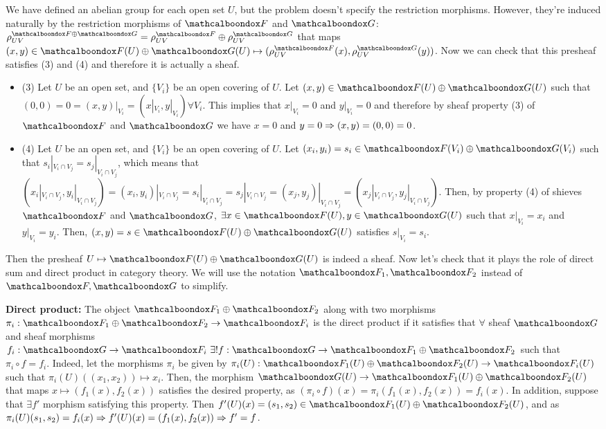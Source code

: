 \begin{sol}
	We have defined an abelian group for each open set $U$, but the problem doesn't specify the restriction morphisms. However, they're induced naturally by the restriction morphisms of $\sF$ and $\sG$: $\rho_{UV}^{\sF \oplus \sG} = \rho_{UV}^{\sF} \oplus \rho_{UV}^{\sG}$ that maps $(x,y) \in \sF(U) \oplus \sG(U) \mapsto (\rho_{UV}^{\sF}(x), \rho_{UV}^{\sG}(y))$. Now we can check that this presheaf satisfies (3) and (4) and therefore it is actually a sheaf.
	\begin{itemize}
		\item (3) Let $U$ be an open set, and $\{V_i\}$ be an open covering of $U$. Let $(x,y) \in \sF(U) \oplus \sG(U)$ such that $(0,0) = 0 = (x,y)|_{V_i} = (x|_{V_i}, y|_{V_i}) \forall V_i$. This implies that $x|_{V_i} = 0$ and $y|_{V_i} = 0$ and therefore by sheaf property (3) of $\sF$ and $\sG$ we have $x = 0$ and $y = 0 \Rightarrow (x,y) = (0,0) = 0$.

		\item (4) Let $U$ be an open set, and $\{V_i\}$ be an open covering of $U$. Let $(x_i, y_i) = s_i \in \sF(V_i) \oplus \sG(V_i)$ such that $s_i|_{V_i \cap V_j} = s_j|_{V_i \cap V_j}$, which means that $(x_i|_{V_i \cap V_j}, y_i|_{V_i \cap V_j}) = (x_i,y_i)|_{V_i \cap V_j} = s_i|_{V_i \cap V_j} = s_j|_{V_i \cap V_j} = (x_j,y_j)|_{V_i \cap V_j} = (x_j|_{V_i \cap V_j}, y_j|_{V_i \cap V_j})$. Then, by property (4) of shieves $\sF$ and $\sG$, $\exists x \in \sF(U), y \in \sG(U)$ such that $x|_{V_i} = x_i$ and $y|_{V_i} = y_i$. Then, $(x,y) = s \in \sF(U) \oplus \sG(U)$ satisfies $s|_{V_i} = s_i$.
	\end{itemize}

	Then the presheaf $U \mapsto \sF(U) \oplus \sG(U)$ is indeed a sheaf. Now let's check that it plays the role of direct sum and direct product in category theory. We will use the notation $\sF_1, \sF_2$ instead of $\sF, \sG$ to simplify.

	\textbf{Direct product:} The object $\sF_1 \oplus \sF_2$ along with two morphisms $\pi_i: \sF_1 \oplus \sF_2 \to \sF_i$ is the direct product if it satisfies that $\forall$ sheaf $\sG$ and sheaf morphisms $f_i: \sG \to \sF_i \, \, \exists ! f: \sG \to \sF_1 \oplus \sF_2$ such that $\pi_i \circ f = f_i$. Indeed, let the morphisms $\pi_i$ be given by $\pi_i(U): \sF_1(U) \oplus \sF_2(U) \to \sF_i(U)$ such that $\pi_i(U)((x_1,x_2)) \mapsto x_i$. Then, the morphism $\sG(U) \to \sF_1(U) \oplus \sF_2(U)$ that maps $x \mapsto (f_1(x), f_2(x))$ satisfies the desired property, as $(\pi_i \circ f)(x) = \pi_i(f_1(x), f_2(x)) = f_i(x)$. In addition, suppose that $\exists f'$ morphism satisfying this property. Then $f'(U)(x) = (s_1,s_2) \in \sF_1(U) \oplus \sF_2(U)$, and as $\pi_i(U)(s_1,s_2) = f_i(x) \Rightarrow f'(U)(x) = (f_1(x),f_2(x)) \Rightarrow f' = f$.


\end{sol}
